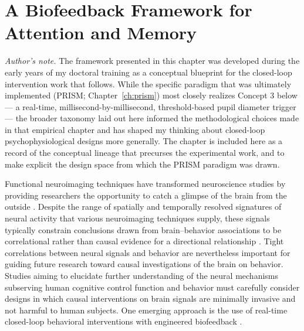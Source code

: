 \chapter[A Biofeedback Framework for Attention and Memory]{A Biofeedback Framework for Attention and Memory}\label{ch:biofeedback-framework}

\textit{Author's note.} The framework presented in this chapter was developed during the early years of my doctoral training as a conceptual blueprint for the closed-loop intervention work that follows. While the specific paradigm that was ultimately implemented (PRISM; Chapter~\ref{ch:prism}) most closely realizes Concept 3 below --- a real-time, millisecond-by-millisecond, threshold-based pupil diameter trigger --- the broader taxonomy laid out here informed the methodological choices made in that empirical chapter and has shaped my thinking about closed-loop psychophysiological designs more generally. The chapter is included here as a record of the conceptual lineage that precurses the experimental work, and to make explicit the design space from which the PRISM paradigm was drawn.

\bigskip

Functional neuroimaging techniques have transformed neuroscience studies by providing researchers the opportunity to catch a glimpse of the brain from the outside \parencite[p.~2]{poldrack2018new}. Despite the range of spatially and temporally resolved signatures of neural activity that various neuroimaging techniques supply, these signals typically constrain conclusions drawn from brain--behavior associations to be correlational rather than causal evidence for a directional relationship \parencites{atkinson2005visual}[cf.][]{weber2010functional}. Tight correlations between neural signals and behavior are nevertheless important for guiding future research toward causal investigations of the brain on behavior. Studies aiming to elucidate further understanding of the neural mechanisms subserving human cognitive control function and behavior must carefully consider designs in which causal interventions on brain signals are minimally invasive and not harmful to human subjects. One emerging approach is the use of real-time closed-loop behavioral interventions with engineered biofeedback \parencite{laconte2011decoding,alkoby2018can}.

